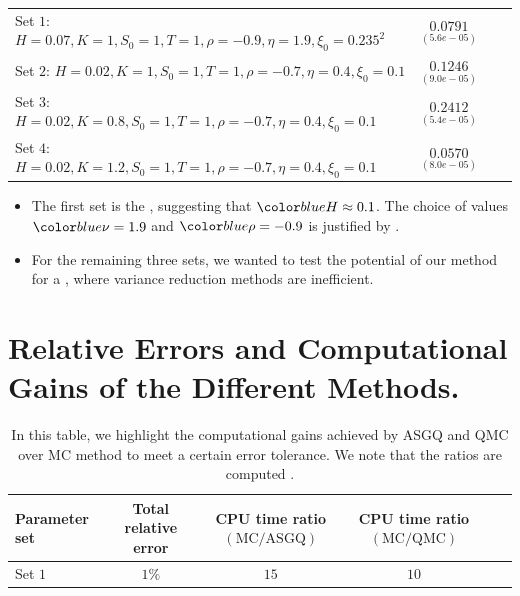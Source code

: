 \documentclass[ima, 20pt, portrait, plainboxedsections]{sciposter}
\begin{document}
\begin{multicols}{3}
\begin{table}[!h]
\begin{small}
\begin{tabular}{l*{2}{c}r}
		Set $1$:	$H=0.07, K=1,S_0=1, T=1, \rho=-0.9, \eta=1.9,\xi_0=0.235^2$   & $\underset{(5.6e-05)}{0.0791}$  \\	
		
		Set $2$:	$H=0.02, K=1, S_0=1, T=1,\rho=-0.7, \eta=0.4,\xi_0=0.1$   & $\underset{(9.0e-05)}{0.1246}$  \\
		Set $3$:	$H=0.02, K=0.8,S_0=1,T=1, \rho=-0.7, \eta=0.4,\xi_0=0.1$   & $\underset{(5.4e-05)}{0.2412}$  \\
		Set $4$:	$H=0.02, K=1.2,S_0=1,T=1, \rho=-0.7, \eta=0.4,\xi_0=0.1$   & $\underset{(8.0e-05)}{0.0570}$  \\
	\bottomrule[1.25pt]
	\end{tabular}
	\end{small}
\end{table}

\begin{itemize}
\item The first set is the   \cite{gatheral2018volatility,bennedsen2016decoupling}, suggesting that $\blue{H} \approx 0.1$. The choice of values $\blue{\nu}= 1.9$ and $\blue{\rho}=-0.9$ is justified by \cite{bayer2016pricing}.

\item  For the remaining three sets, we wanted to test the potential of our method for a , where variance reduction methods are inefficient.
\end{itemize}
\section*{Relative Errors and Computational Gains of the Different Methods.}
\begin{table}[!h]
	\centering
	\caption{ In this table, we highlight the computational gains achieved by ASGQ and QMC over MC method to meet a certain error tolerance. We note that the ratios are computed .}
	\begin{small}
		\begin{tabular}{l*{4}{c}r}
			\toprule[1.5pt]
			\textbf{Parameter set}              &  \textbf{Total relative error}  & \textbf{CPU time ratio $\left(\text{MC}/ \text{ASGQ} \right)$} & \textbf{CPU time ratio  $\left(\text{MC}/ \text{QMC} \right)$}\\
			\hline
			Set $1$  &  $1\%$&  $ 15$ &  $10$\\	
			

\end{tabular}
\end{small}
\end{table}
\end{multicols}
\end{document}

